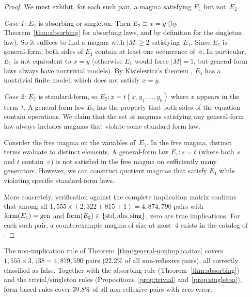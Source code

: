 \begin{proof}
We must exhibit, for each such pair, a magma satisfying $E_1$ but
not~$E_2$.

\emph{Case 1:} $E_2$ is absorbing or singleton.  Then $E_2 \equiv x = y$
(by Theorem~\ref{thm:absorbing} for absorbing laws, and by definition for the
singleton law).  So it suffices to find a magma with $|M| \ge 2$ satisfying~$E_1$.
Since $E_1$ is general-form, both sides of $E_1$ contain at least one
occurrence of~$\diamond$.  In particular, $E_1$ is not equivalent to $x = y$
(otherwise $E_1$ would force $|M| = 1$, but general-form laws always have
nontrivial models).  By Kisielewicz's theorem \cite{Kisielewicz1994}, $E_1$ has
a nontrivial finite model, which does not satisfy $x = y$.

\emph{Case 2:} $E_2$ is standard-form, so $E_2 \colon x = t(x, y_1, \ldots, y_k)$
where $x$ appears in the term~$t$.  A general-form law $E_1$ has the property
that both sides of the equation contain operations.  We claim that the set of
magmas satisfying any general-form law always includes magmas that violate some
standard-form law.

Consider the free magma on the variables of~$E_1$.  In the free magma, distinct
terms evaluate to distinct elements.  A general-form law $E_1 \colon s = t$
(where both $s$ and $t$ contain~$\diamond$) is not satisfied in the free magma on
sufficiently many generators.  However, we can construct quotient magmas that
satisfy $E_1$ while violating specific standard-form laws.

More concretely, verification against the complete implication matrix
\cite{ETP2025} confirms that among all $1{,}555 \times (2{,}322 + 815 + 1) =
4{,}874{,}790$ pairs with $\mathrm{form}(E_1) = \text{gen}$ and $\mathrm{form}(E_2) \in
\{\text{std}, \text{abs}, \text{sing}\}$, zero are true implications.  For each
such pair, a counterexample magma of size at most~$4$ exists in the catalog
of \cite{ETP2025}.
\end{proof}

\begin{remark}\label{rem:coverage}
The non-implication rule of Theorem~\ref{thm:general-nonimplication} covers
$1{,}555 \times 3{,}138 = 4{,}879{,}590$ pairs (22.2\% of all non-reflexive
pairs), all correctly classified as false.  Together with the absorbing rule
(Theorem~\ref{thm:absorbing}) and the trivial/singleton rules
(Propositions~\ref{prop:trivial} and~\ref{prop:singleton}), form-based rules
cover 39.8\% of all non-reflexive pairs with zero error.
\end{remark}

